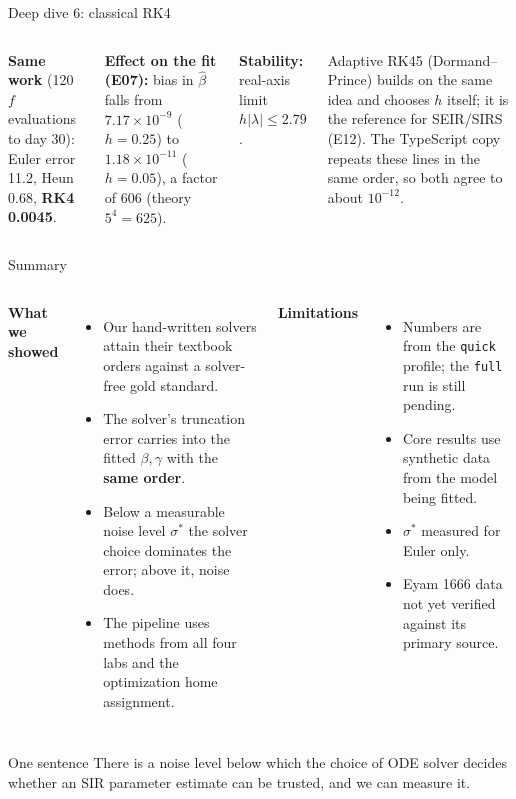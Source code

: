 \documentclass[aspectratio=169,11pt]{beamer}
\newcommand{\hl}[1]{\textcolor{accent}{\textbf{#1}}}
\begin{document}
\begin{frame}[fragile,shrink=5]{Deep dive 6: classical RK4}
\begin{columns}[T]
    \vspace{0.3em}
    \textbf{Same work} (120 $f$ evaluations to day 30): Euler error 11.2, Heun 0.68, \textbf{RK4 0.0045}.

    \vspace{0.3em}
    \textbf{Effect on the fit (E07):} bias in $\hat\beta$ falls from $7.17\times10^{-9}$ ($h=0.25$) to $1.18\times10^{-11}$ ($h=0.05$), a factor of 606 (theory $5^4=625$).

    \vspace{0.3em}
    \textbf{Stability:} real-axis limit $h|\lambda|\le 2.79$.

    \vspace{0.3em}
    {\color{muted} Adaptive RK45 (Dormand--Prince) builds on the same idea and chooses $h$ itself; it is the reference for SEIR/SIRS (E12). The TypeScript copy repeats these lines in the same order, so both agree to about $10^{-12}$.}
  \end{columns}
\end{frame}

\begin{frame}{Summary}
  \begin{columns}[T]
    \textbf{What we showed}
    \begin{itemize}\small
      \item Our hand-written solvers attain their textbook orders against a solver-free gold standard.
      \item The solver's truncation error carries into the fitted $\beta,\gamma$ with the \hl{same order}.
      \item Below a measurable noise level $\sigma^*$ the solver choice dominates the error; above it, noise does.
      \item The pipeline uses methods from all four labs and the optimization home assignment.
    \end{itemize}
    \textbf{Limitations}
    \begin{itemize}\scriptsize
      \item Numbers are from the \texttt{quick} profile; the \texttt{full} run is still pending.
      \item Core results use synthetic data from the model being fitted.
      \item $\sigma^*$ measured for Euler only.
      \item Eyam 1666 data not yet verified against its primary source.
    \end{itemize}
  \end{columns}
  \vspace{0.8em}
  \begin{block}{One sentence}
    There is a noise level below which the choice of ODE solver decides whether an SIR parameter estimate can be trusted, and we can measure it.
  \end{block}
\end{frame}
\end{document}

